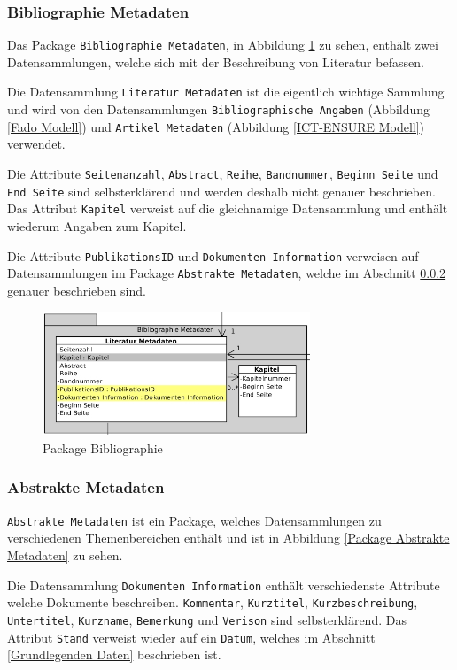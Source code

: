 \subsubsection{Bibliographie Metadaten}
Das Package \texttt{Bibliographie Metadaten}, in Abbildung \ref{Package Bibliographie} zu sehen, enth\"alt zwei Datensammlungen, welche sich mit der Beschreibung von Literatur befassen. 

Die Datensammlung \texttt{Literatur Metadaten} ist die eigentlich wichtige Sammlung und wird von den Datensammlungen \texttt{Bibliographische Angaben} (Abbildung \ref{Fado Modell}) und \texttt{Artikel Metadaten} (Abbildung \ref{ICT-ENSURE Modell}) verwendet.

Die Attribute \texttt{Seitenanzahl}, \texttt{Abstract}, \texttt{Reihe}, \texttt{Bandnummer}, \texttt{Beginn Seite} und \texttt{End Seite} sind selbsterkl\"arend und werden deshalb nicht genauer beschrieben. Das Attribut \texttt{Kapitel} verweist auf die gleichnamige Datensammlung und enth\"alt wiederum Angaben zum Kapitel.

Die Attribute \texttt{PublikationsID} und \texttt{Dokumenten Information} verweisen auf Datensammlungen im Package \texttt{Abstrakte Metadaten}, welche im Abschnitt \ref{Abstrakte Metadaten} genauer beschrieben sind.
\begin{figure}[!ht]
\centering
\includegraphics[width=8cm]{Bilder/Datenmodell/Package-Bibliographie.jpg}
\caption{Package Bibliographie}
\label{Package Bibliographie}
\centering
\end{figure}

\subsubsection{Abstrakte Metadaten}\label{Abstrakte Metadaten}
\texttt{Abstrakte Metadaten} ist ein Package, welches Datensammlungen zu verschiedenen Themenbereichen enth\"alt und ist in Abbildung \ref{Package Abstrakte Metadaten} zu sehen. 

Die Datensammlung \texttt{Dokumenten Information} enth\"alt verschiedenste Attribute welche Dokumente beschreiben. \texttt{Kommentar}, \texttt{Kurztitel}, \texttt{Kurzbeschreibung}, \texttt{Untertitel}, \texttt{Kurzname}, \texttt{Bemerkung} und \texttt{Verison} sind selbsterkl\"arend. Das Attribut \texttt{Stand} verweist wieder auf ein \texttt{Datum}, welches im Abschnitt \ref{Grundlegenden Daten} beschrieben ist.


